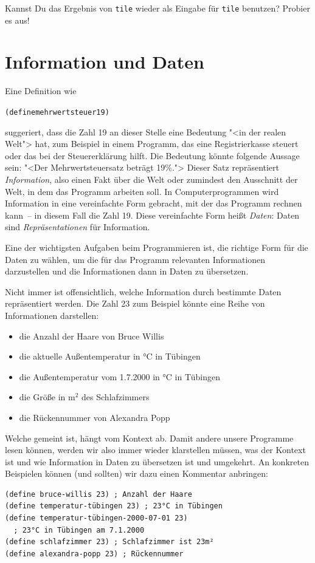 \begin{aufgabeinline}
  Kannst Du das Ergebnis von \texttt{tile} wieder als Eingabe für
  \texttt{tile} benutzen?  Probier es aus!
\end{aufgabeinline}

\section{Information und Daten}
\label{sec:information-daten}

Eine Definition wie
%
\begin{alltt}
(define mehrwertsteuer 19)
\end{alltt}
%
suggeriert, dass die Zahl 19 an dieser Stelle eine Bedeutung "<in der
realen Welt"> hat, zum Beispiel in einem Programm, das eine Registrierkasse
steuert oder das bei der Steuererklärung hilft.  Die Bedeutung könnte
folgende Aussage sein: "<Der Mehrwertsteuersatz beträgt 19\%.">
Dieser Satz repräsentiert \textit{Information},
also einen Fakt über die Welt oder zumindest den Ausschnitt der Welt, in
dem das Programm arbeiten soll.  In Computerprogrammen wird
Information in eine vereinfachte Form gebracht, mit der das Programm
rechnen kann~-- in diesem Fall die Zahl 19.  Diese vereinfachte Form
heißt \textit{Daten}: Daten sind
\textit{Repräsentationen} für Information.

Eine der wichtigsten Aufgaben beim Programmieren ist, die richtige
Form für die Daten zu wählen, um die für das Programm relevanten
Informationen darzustellen und die Informationen dann in Daten zu
übersetzen.

Nicht immer ist offensichtlich, welche Information durch bestimmte
Daten repräsentiert werden.  Die Zahl 23 zum Beispiel könnte eine Reihe
von Informationen darstellen:
%
\begin{itemize}
\item die Anzahl der Haare von Bruce Willis
\item die aktuelle Außentemperatur in °C in Tübingen
\item die Außentemperatur vom 1.7.2000 in °C in Tübingen
\item die Größe in m$^2$ des Schlafzimmers
\item die Rückennummer von Alexandra Popp
\end{itemize}
%
Welche gemeint ist, hängt vom Kontext ab.  Damit andere unsere
Programme lesen können, werden wir also immer wieder klarstellen
müssen, was der Kontext ist und wie Information in Daten zu übersetzen
ist und umgekehrt.  An konkreten Beispielen können (und sollten) wir
dazu einen Kommentar anbringen:
%
\begin{verbatim}
(define bruce-willis 23) ; Anzahl der Haare
(define temperatur-tübingen 23) ; 23°C in Tübingen
(define temperatur-tübingen-2000-07-01 23)
  ; 23°C in Tübingen am 7.1.2000
(define schlafzimmer 23) ; Schlafzimmer ist 23m²
(define alexandra-popp 23) ; Rückennummer
\end{verbatim}

